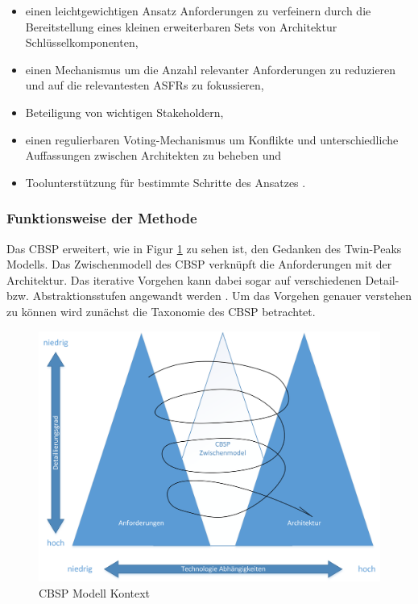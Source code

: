 \begin{itemize}
\item einen leichtgewichtigen Ansatz Anforderungen zu verfeinern durch die Bereitstellung eines kleinen erweiterbaren Sets von Architektur Schlüsselkomponenten, 
\item einen Mechanismus um die Anzahl relevanter Anforderungen zu reduzieren und auf die relevantesten ASFRs zu fokussieren, 
\item Beteiligung von wichtigen Stakeholdern, 
\item einen regulierbaren Voting-Mechanismus um Konflikte und unterschiedliche Auffassungen zwischen Architekten zu beheben und
\item Toolunterstützung für bestimmte Schritte des Ansatzes \cite{Gru01}. \\
\end{itemize}

\subsubsection{Funktionsweise der Methode}

Das CBSP erweitert, wie in Figur \ref{fig_cbsp_model} zu sehen ist, den Gedanken des Twin-Peaks Modells. Das Zwischenmodell des CBSP verknüpft die Anforderungen mit der Architektur. Das iterative Vorgehen kann dabei sogar auf verschiedenen Detail- bzw. Abstraktionsstufen angewandt werden \cite{Gru01}. 
Um das Vorgehen genauer verstehen zu können wird zunächst die Taxonomie des CBSP betrachtet. \\

\begin{figure}[h]
	\centering
	\includegraphics[scale=0.5]{cbsp_model2.png} 
	\caption{CBSP Modell Kontext \cite{Gru01}}
	\label{fig_cbsp_model}
\end{figure}

